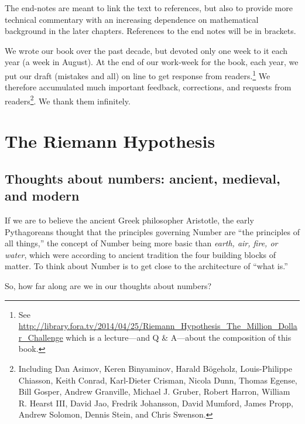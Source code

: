 \documentclass[openany]{book}
\theoremstyle{plain}
\theoremstyle{definition}
\newcommand{\RH}{Riemann Hypothesis\index{Riemann Hypothesis}}
\begin{document}
      The end-notes are meant to link the text to references, but also to provide  more technical commentary with an increasing dependence on mathematical background in the later chapters.  References to the end notes will be in brackets.

      We wrote our book over the past decade, but devoted only one week to it each year (a week in August).    At the end of our work-week for the book, each year, we put our draft (mistakes and all) on line to get response from readers.{\footnote{See  {\url{http://library.fora.tv/2014/04/25/Riemann_Hypothesis_The_Million_Dollar_Challenge}} which is a lecture---and Q \& A---about the composition of this book.}} We therefore accumulated much important feedback, corrections, and requests from readers\footnote{Including
Dan Asimov, Keren Binyaminov, Harald B\"{o}geholz, Louis-Philippe Chiasson, Keith Conrad, Karl-Dieter Crisman, Nicola Dunn, Thomas Egense, Bill Gosper,  Andrew Granville, Michael J. Gruber, Robert Harron,  William R. Hearst III, David Jao, Fredrik Johansson, David Mumford, James Propp, Andrew Solomon, Dennis Stein, and Chris Swenson.}.
We thank them infinitely.


\part{The \RH{}\label{part1}}


\chapter[Thoughts about numbers]{Thoughts about numbers: ancient, medieval, and modern}

If we are to believe the ancient Greek philosopher Aristotle, the early
Pythagoreans thought that the principles governing Number are ``the
principles of all things,'' the concept of Number being more basic than
{\em earth, air, fire, or water}, which were according to ancient tradition
the four building blocks of matter. To think about Number is to get
close to the architecture of ``what is.''

So, how far along are we in our thoughts about numbers?



\end{document}
